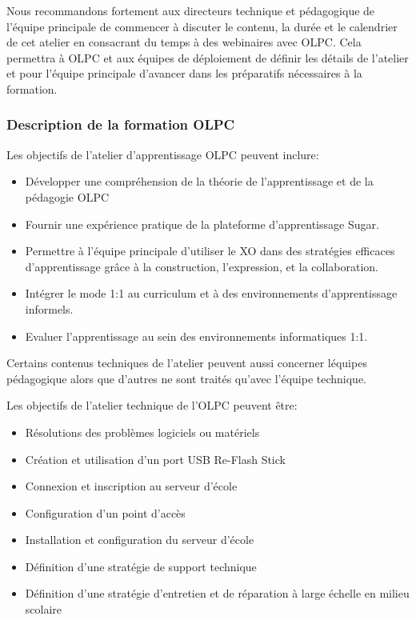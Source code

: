 \documentclass[12pt]{article}
\begin{document}
Nous recommandons fortement aux directeurs technique et pédagogique de
l'équipe principale de commencer à discuter le contenu, la durée et le
calendrier de cet atelier en consacrant du temps à des webinaires avec
OLPC. Cela permettra à OLPC et aux équipes de déploiement de définir les
détails de l'atelier et pour l'équipe principale d'avancer dans les
préparatifs nécessaires à la formation.
\subsubsection{Description de la formation OLPC}
\label{sec-9-2-1}



Les objectifs de l'atelier d'apprentissage OLPC peuvent inclure:

\begin{itemize}
\item Développer une compréhension de la théorie de l'apprentissage et de la
  pédagogie OLPC
\item Fournir une expérience pratique de la plateforme d'apprentissage Sugar.
\item Permettre à l'équipe principale d'utiliser le XO dans des stratégies
  efficaces d'apprentissage grâce à la construction, l'expression, et la
  collaboration.
\item Intégrer le mode 1:1 au curriculum et à des environnements
  d'apprentissage informels.
\item Evaluer l'apprentissage au sein des environnements informatiques 1:1.
\end{itemize}

Certains contenus techniques de l'atelier peuvent aussi concerner  léquipes
pédagogique  alors que d'autres ne sont traités qu'avec l'équipe technique.

Les objectifs de l'atelier technique de l'OLPC peuvent être:

\begin{itemize}
\item Résolutions des problèmes logiciels ou matériels
\item Création et utilisation d'un port USB Re-Flash Stick
\item Connexion et inscription au serveur d'école
\item Configuration d'un point d'accès
\item Installation et configuration du serveur d'école
\item Définition d'une stratégie de support technique
\item Définition d'une stratégie d'entretien et de réparation à large échelle en
  milieu scolaire
\end{itemize}
\end{document}
